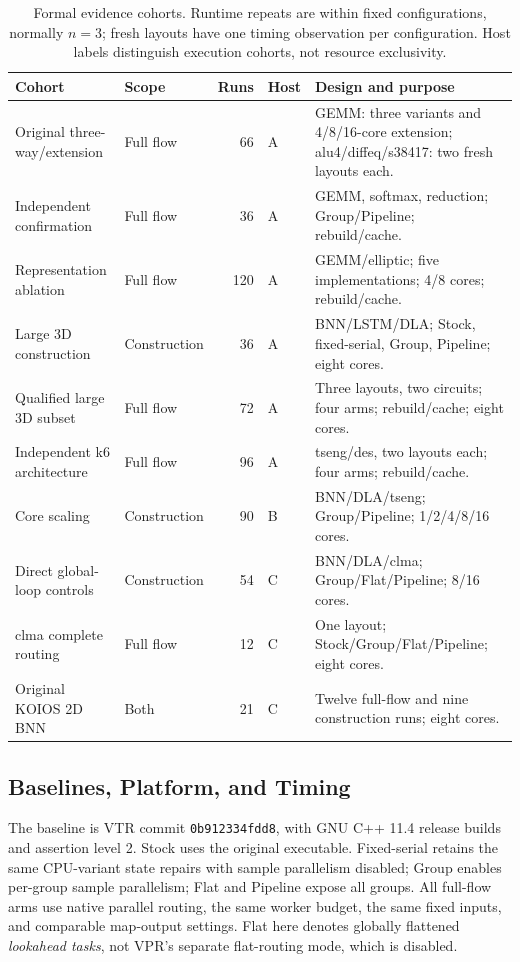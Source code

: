 \documentclass[conference,10pt,letterpaper]{IEEEtran}
\begin{document}
\begin{table}[t]
\centering\footnotesize
\caption{Formal evidence cohorts. Runtime repeats are within fixed configurations, normally $n=3$; fresh layouts have one timing observation per configuration. Host labels distinguish execution cohorts, not resource exclusivity.}
\label{tab:cohorts}
\setlength{\tabcolsep}{4pt}
\begin{tabular}{llrlp{7.0cm}}
\toprule
Cohort & Scope & Runs & Host & Design and purpose \\
\midrule
Original three-way/extension & Full flow & 66 & A & GEMM: three variants and 4/8/16-core extension; alu4/diffeq/s38417: two fresh layouts each. \\
Independent confirmation & Full flow & 36 & A & GEMM, softmax, reduction; Group/Pipeline; rebuild/cache. \\
Representation ablation & Full flow & 120 & A & GEMM/elliptic; five implementations; 4/8 cores; rebuild/cache. \\
Large 3D construction & Construction & 36 & A & BNN/LSTM/DLA; Stock, fixed-serial, Group, Pipeline; eight cores. \\
Qualified large 3D subset & Full flow & 72 & A & Three layouts, two circuits; four arms; rebuild/cache; eight cores. \\
Independent k6 architecture & Full flow & 96 & A & tseng/des, two layouts each; four arms; rebuild/cache. \\
Core scaling & Construction & 90 & B & BNN/DLA/tseng; Group/Pipeline; 1/2/4/8/16 cores. \\
Direct global-loop controls & Construction & 54 & C & BNN/DLA/clma; Group/Flat/Pipeline; 8/16 cores. \\
clma complete routing & Full flow & 12 & C & One layout; Stock/Group/Flat/Pipeline; eight cores. \\
Original KOIOS 2D BNN & Both & 21 & C & Twelve full-flow and nine construction runs; eight cores. \\
\bottomrule
\end{tabular}
\end{table}

\subsection{Baselines, Platform, and Timing}
The baseline is VTR commit \texttt{0b912334fdd8}, with GNU C++ 11.4 release builds and assertion level 2. Stock uses the original executable. Fixed-serial retains the same CPU-variant state repairs with sample parallelism disabled; Group enables per-group sample parallelism; Flat and Pipeline expose all groups. All full-flow arms use native parallel routing, the same worker budget, the same fixed inputs, and comparable map-output settings. Flat here denotes globally flattened \emph{lookahead tasks}, not VPR's separate flat-routing mode, which is disabled.
\end{document}
